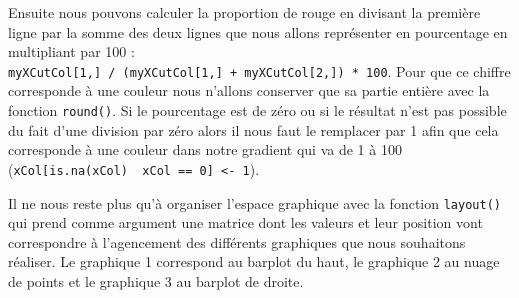 \documentclass[]{book}
\begin{document}
Ensuite nous pouvons calculer la proportion de rouge en divisant la première ligne par la somme des deux lignes que nous allons représenter en pourcentage en multipliant par 100 : \texttt{myXCutCol{[}1,{]}\ /\ (myXCutCol{[}1,{]}\ +\ myXCutCol{[}2,{]})\ *\ 100}. Pour que ce chiffre corresponde à une couleur nous n'allons conserver que sa partie entière avec la fonction \texttt{round()}. Si le pourcentage est de zéro ou si le résultat n'est pas possible du fait d'une division par zéro alors il nous faut le remplacer par 1 afin que cela corresponde à une couleur dans notre gradient qui va de 1 à 100 (\texttt{xCol{[}is.na(xCol)\ \textbar{}\ xCol\ ==\ 0{]}\ \textless{}-\ 1}).

Il ne nous reste plus qu'à organiser l'espace graphique avec la fonction \texttt{layout()} qui prend comme argument une matrice dont les valeurs et leur position vont correspondre à l'agencement des différents graphiques que nous souhaitons réaliser. Le graphique 1 correspond au barplot du haut, le graphique 2 au nuage de points et le graphique 3 au barplot de droite.
\end{document}

